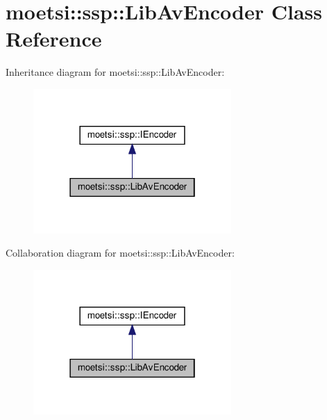 \hypertarget{classmoetsi_1_1ssp_1_1LibAvEncoder}{}\section{moetsi\+:\+:ssp\+:\+:Lib\+Av\+Encoder Class Reference}
\label{classmoetsi_1_1ssp_1_1LibAvEncoder}


Inheritance diagram for moetsi\+:\+:ssp\+:\+:Lib\+Av\+Encoder\+:\nopagebreak
\begin{figure}[H]
\begin{center}
\leavevmode
\includegraphics[width=214pt]{classmoetsi_1_1ssp_1_1LibAvEncoder__inherit__graph}
\end{center}
\end{figure}


Collaboration diagram for moetsi\+:\+:ssp\+:\+:Lib\+Av\+Encoder\+:\nopagebreak
\begin{figure}[H]
\begin{center}
\leavevmode
\includegraphics[width=214pt]{classmoetsi_1_1ssp_1_1LibAvEncoder__coll__graph}
\end{center}
\end{figure}
